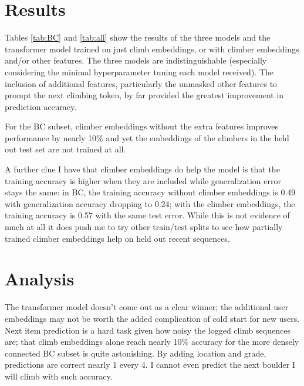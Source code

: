 \documentclass[10pt]{article}
\begin{document}
\section{Results} 

Tables \ref{tab:BC} and \ref{tab:all} show the results of the three models and the transformer model trained on just climb embeddings, or with climber embeddings and/or other features. The three models are indistinguishable (especially considering the minimal hyperparameter tuning each model received). The inclusion of additional features, particularly the unmasked other features to prompt the next climbing token, by far provided the greatest improvement in prediction accuracy. 

For the BC subset, climber embeddings without the extra features improves performance by nearly 10\% and yet the embeddings of the climbers in the held out test set are not trained at all. 

A further clue I have that climber embeddings do help the model is that the training accuracy is higher when they are included while generalization error stays the same: in BC, the training accuracy without climber embeddings is 0.49 with generalization accuracy dropping to 0.24; with the climber embeddings, the training accuracy is 0.57 with the same test error. While this is not evidence of much at all it does push me to try other train/test splits to see how partially trained climber embeddings help on held out recent sequences. 


\section{Analysis} 

The transformer model doesn't come out as a clear winner; the additional user embeddings may not be worth the added complication of cold start for new users. Next item prediction is a hard task given how noisy the logged climb sequences are; that climb embeddings alone reach nearly 10\% accuracy for the more densely connected BC subset is quite astonishing. By adding location and grade, predictions are correct nearly 1 every 4. I cannot even predict the next boulder I will climb with such accuracy.

\end{document}
